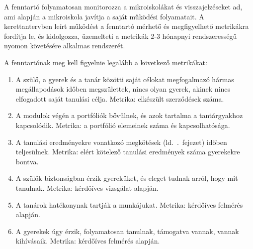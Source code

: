 A fenntartó folyamatosan monitorozza a mikroiskolákat és visszajelzéseket ad,
ami alapján a mikroiskola javítja a saját működési folyamatait. A kerettantervben leírt működést a
fenntartó mérhető és megfigyelhető metrikákra fordítja le, és kidolgozza,
üzemelteti a metrikák 2-3 hónapnyi rendszerességű nyomon követésére alkalmas
rendszerét.

A fenntartónak meg kell figyelnie legalább a következő metrikákat:
\begin{enumerate}
      \item A szülő, a gyerek és a tanár közötti saját célokat megfogalmazó
            hármas
            megállapodások időben megszülettek, nincs olyan gyerek, akinek
            nincs
            elfogadott
            saját tanulási célja. Metrika: elkészült szerződések száma.

      \item A modulok végén a portfóliók bővülnek, és azok tartalma a
            tantárgyakhoz
            kapcsolódik. Metrika: a portfólió elemeinek száma és kapcsolhatósága.
      \item A tanulási eredményekre vonatkozó megkötések
            (ld.~.~fejezet) időben teljesülnek.
            Metrika: elért kötelező tanulási eredmények száma gyerekekre
            bontva.

      \item A szülők biztonságban érzik gyereküket, és eleget tudnak arról,
            hogy
            mit
            tanulnak. Metrika: kérdőíves vizsgálat alapján.

      \item A tanárok hatékonynak tartják a munkájukat. Metrika: kérdőíves felmérés
            alapján.

      \item A gyerekek úgy érzik, folyamatosan tanulnak, támogatva vannak,
            vannak
            kihívásaik. Metrika: kérdőíves felmérés alapján.
\end{enumerate}
